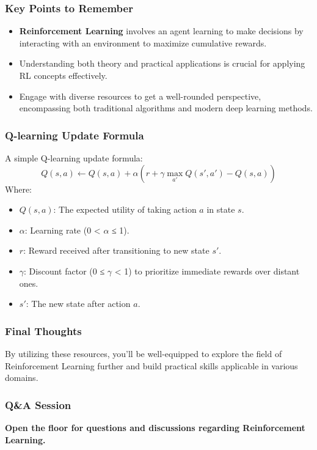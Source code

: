 \documentclass[aspectratio=169]{beamer}
\begin{document}
\begin{frame}[fragile]
    \frametitle{Key Points to Remember}
    \begin{itemize}
        \item \textbf{Reinforcement Learning} involves an agent learning to make decisions by interacting with an environment to maximize cumulative rewards.
        \item Understanding both theory and practical applications is crucial for applying RL concepts effectively.
        \item Engage with diverse resources to get a well-rounded perspective, encompassing both traditional algorithms and modern deep learning methods.
    \end{itemize}
\end{frame}

\begin{frame}[fragile]
    \frametitle{Q-learning Update Formula}
    A simple Q-learning update formula:
    \begin{equation}
    Q(s, a) \leftarrow Q(s, a) + \alpha \left( r + \gamma \max_{a'} Q(s', a') - Q(s, a) \right)
    \end{equation}
    Where:
    \begin{itemize}
        \item \( Q(s,a) \): The expected utility of taking action \( a \) in state \( s \).
        \item \( \alpha \): Learning rate (0 < \( \alpha \) ≤ 1).
        \item \( r \): Reward received after transitioning to new state \( s' \).
        \item \( \gamma \): Discount factor (0 ≤ \( \gamma \) < 1) to prioritize immediate rewards over distant ones.
        \item \( s' \): The new state after action \( a \).
    \end{itemize}
\end{frame}

\begin{frame}[fragile]
    \frametitle{Final Thoughts}
    By utilizing these resources, you'll be well-equipped to explore the field of Reinforcement Learning further and build practical skills applicable in various domains.
\end{frame}

\begin{frame}[fragile]
    \frametitle{Q\&A Session}
    \textbf{Open the floor for questions and discussions regarding Reinforcement Learning.}
\end{frame}
\end{document}
